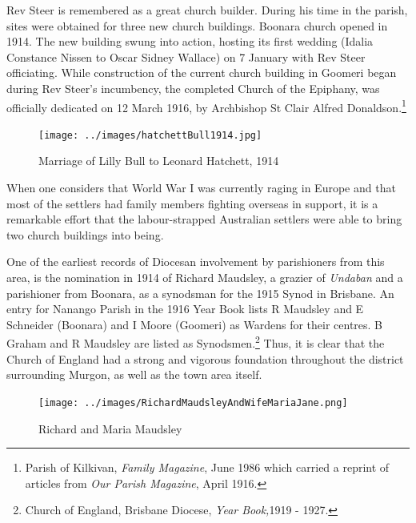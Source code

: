 Rev Steer is remembered as a great church builder. During his time in the parish, sites were obtained for three new church buildings. Boonara church opened in 1914. The new building swung into action, hosting its first wedding (Idalia Constance Nissen to Oscar Sidney Wallace) on 7 January with Rev Steer officiating. While construction of the current church building in Goomeri began during Rev Steer's incumbency, the completed Church of the Epiphany, was officially dedicated on 12 March 1916, by Archbishop St Clair Alfred Donaldson.\footnote{Parish of Kilkivan, \emph{Family Magazine}, June 1986 which carried a reprint of articles from \emph{Our Parish Magazine}, April 1916.}








\begin{figure}[!htb]
\begin{center}
\texttt{[image: ../images/hatchettBull1914.jpg]}
\caption{Marriage of Lilly Bull to Leonard Hatchett, 1914}
\end{center}
\end{figure}




When one considers that World War I was currently raging in Europe and that most of the settlers had family members fighting overseas in support, it is a remarkable effort that the labour-strapped Australian settlers were able to bring two church buildings into being.



One of the earliest records of Diocesan involvement by parishioners from this area, is the nomination in 1914 of Richard Maudsley, a grazier of \emph{Undaban} and a parishioner from Boonara, as a synodsman for the 1915 Synod in Brisbane. An entry for Nanango Parish in the 1916 Year Book lists R Maudsley and E Schneider (Boonara) and I Moore (Goomeri) as Wardens for their centres. B Graham and R Maudsley are listed as Synodsmen.\footnote{Church of England, Brisbane Diocese, \emph{Year Book,}1919 - 1927.} Thus, it is clear that the Church of England had a strong and vigorous foundation throughout the district surrounding Murgon, as well as the town area itself.








\begin{figure}
\begin{center}
\texttt{[image: ../images/RichardMaudsleyAndWifeMariaJane.png]}
\caption{Richard and Maria Maudsley}
\end{center}
\end{figure}




